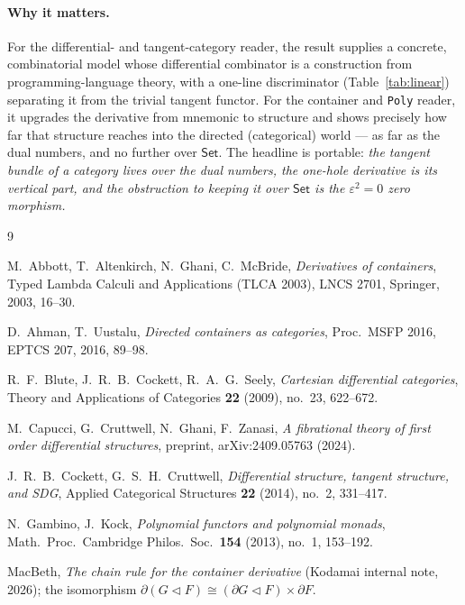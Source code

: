 \documentclass[11pt]{article}
\theoremstyle{definition}
\newcommand{\Set}{\mathsf{Set}}
\begin{document}
\paragraph{Why it matters.}
For the differential- and tangent-category reader, the result supplies a concrete, combinatorial model
whose differential combinator is a construction from programming-language theory, with a one-line
discriminator (Table~\ref{tab:linear}) separating it from the trivial tangent functor. For the
container and \texttt{Poly} reader, it upgrades the derivative from mnemonic to structure and shows
precisely how far that structure reaches into the directed (categorical) world --- as far as the dual
numbers, and no further over $\Set$. The headline is portable: \emph{the tangent bundle of a category
lives over the dual numbers, the one-hole derivative is its vertical part, and the obstruction to
keeping it over $\Set$ is the $\varepsilon^2=0$ zero morphism.}

\begin{thebibliography}{9}

M.~Abbott, T.~Altenkirch, N.~Ghani, C.~McBride,
\emph{Derivatives of containers},
Typed Lambda Calculi and Applications (TLCA 2003), LNCS 2701, Springer, 2003, 16--30.

D.~Ahman, T.~Uustalu,
\emph{Directed containers as categories},
Proc.\ MSFP 2016, EPTCS 207, 2016, 89--98.

R.~F.~Blute, J.~R.~B.~Cockett, R.~A.~G.~Seely,
\emph{Cartesian differential categories},
Theory and Applications of Categories \textbf{22} (2009), no.~23, 622--672.

M.~Capucci, G.~Cruttwell, N.~Ghani, F.~Zanasi,
\emph{A fibrational theory of first order differential structures},
preprint, arXiv:2409.05763 (2024).

J.~R.~B.~Cockett, G.~S.~H.~Cruttwell,
\emph{Differential structure, tangent structure, and SDG},
Applied Categorical Structures \textbf{22} (2014), no.~2, 331--417.

N.~Gambino, J.~Kock,
\emph{Polynomial functors and polynomial monads},
Math.\ Proc.\ Cambridge Philos.\ Soc.\ \textbf{154} (2013), no.~1, 153--192.

MacBeth,
\emph{The chain rule for the container derivative} (Kodamai internal note, 2026);
the isomorphism $\partial(G\lhd F)\cong(\partial G\lhd F)\times\partial F$.

\end{thebibliography}
\end{document}
